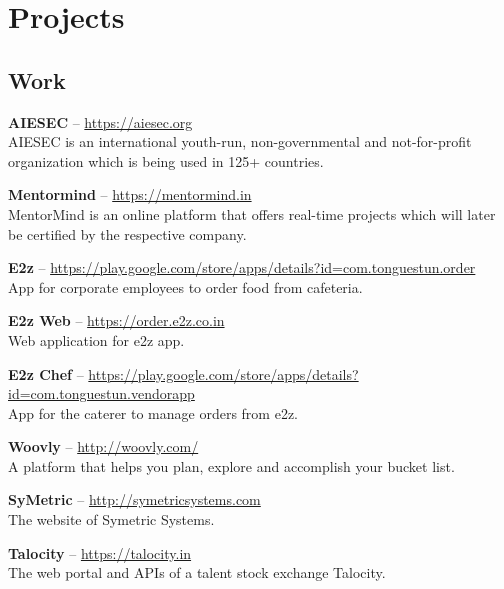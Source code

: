 \documentclass[11pt,a4paper]{moderncv}
\begin{document}
\section{Projects}

\subsection{Work}

\cvlistitem
{\textbf{AIESEC} -- {\small \href{https://aiesec.org}{https://aiesec.org}}
  \\AIESEC is an international youth-run, non-governmental and not-for-profit organization which is being used in 125+ countries.
}

\cvlistitem
{\textbf{Mentormind} -- {\small \href{https://mentormind.in}{https://mentormind.in}}
  \\MentorMind is an online platform that offers real-time projects which will later be certified by the respective company.
}

\cvlistitem
{\textbf{E2z} -- {\small \href{https://play.google.com/store/apps/details?id=com.tonguestun.order}{https://play.google.com/store/apps/details?id=com.tonguestun.order}}
  \\App for corporate employees to order food from cafeteria.
}

\cvlistitem
{\textbf{E2z Web} -- {\small \href{https://order.e2z.co.in}{https://order.e2z.co.in}}
  \\Web application for e2z app.
}

\cvlistitem
{\textbf{E2z Chef} -- {\small \href{https://play.google.com/store/apps/details?id=com.tonguestun.vendorapp}{https://play.google.com/store/apps/details?id=com.tonguestun.vendorapp}}
  \\App for the caterer to manage orders from e2z.
}

\cvlistitem
{\textbf{Woovly} -- {\small \href{http://woovly.com/}{http://woovly.com/}}
  \\A platform that helps you plan, explore and accomplish your bucket list.
}

\cvlistitem
{\textbf{SyMetric} -- {\small \href{http://symetricsystems.com}{http://symetricsystems.com}}
  \\The website of Symetric Systems.
}

\cvlistitem
{\textbf{Talocity} -- {\small \href{https://talocity.in}{https://talocity.in}}
  \\The web portal and APIs of a talent stock exchange Talocity.
}
\end{document}
